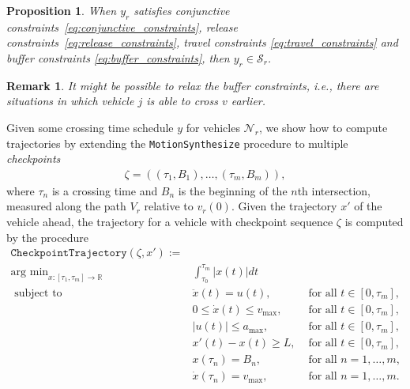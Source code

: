 \documentclass[a4paper]{article}
\theoremstyle{definition}
\theoremstyle{plain}
\newtheorem{proposition}{Proposition}
\newtheorem{remark}{Remark}
\begin{document}
\begin{proposition}
  When $y_{r}$ satisfies conjunctive
  constraints~\eqref{eq:conjunctive_constraints}, release constraints~\eqref{eq:release_constraints}, travel constraints \eqref{eq:travel_constraints} and buffer
  constraints \eqref{eq:buffer_constraints}, then $y_{r} \in \mathcal{S}_{r}$.
\end{proposition}

\begin{remark}
  It might be possible to relax the buffer constraints, i.e., there are
  situations in which vehicle $j$ is able to cross $v$ earlier.
\end{remark}


Given some crossing time schedule $y$ for vehicles $\mathcal{N}_{r}$, we show
how to compute trajectories by extending the \texttt{MotionSynthesize} procedure to
multiple \textit{checkpoints}
%
\begin{align*}
  \zeta = ((\tau_{1}, B_{1}), \dots, (\tau_{m}, B_{m})) ,
\end{align*}
where $\tau_{n}$ is a crossing time and $B_{n}$ is the beginning of the $n$th
intersection, measured along the path $V_{r}$ relative to $v_{r}(0)$.
%
Given the trajectory $x'$ of the vehicle ahead, the trajectory for a vehicle with
checkpoint sequence $\zeta$ is computed by the procedure
%
\begin{align*}
  \texttt{CheckpointTrajectory}(\zeta, x') := \\
  \text{arg min}_{x : [\tau_{1}, \tau_{m}] \rightarrow \mathbb{R}} \; &\int_{\tau_{0}}^{\tau_{m}} |x(t)|dt \\
  \text{ subject to } \; & \ddot{x}(t) = u(t) ,& \text{ for all } t \in [0, \tau_{m}] , \\
  & 0 \leq \dot{x}(t) \leq v_{\max} ,& \text{ for all } t \in [0, \tau_{m}] , \\
  & |u(t)| \leq a_{\max} ,& \text{ for all } t \in [0, \tau_{m}] , \\
  & x'(t) - x(t) \geq L ,& \text{ for all } t \in [0, \tau_{m}] , \\
  & x(\tau_{n}) = B_{n} ,& \text{ for all } n = 1, \dots, m , \\
  & \dot{x}(\tau_{n}) = v_{\max} ,& \text{ for all } n = 1, \dots, m .
\end{align*}




\end{document}
